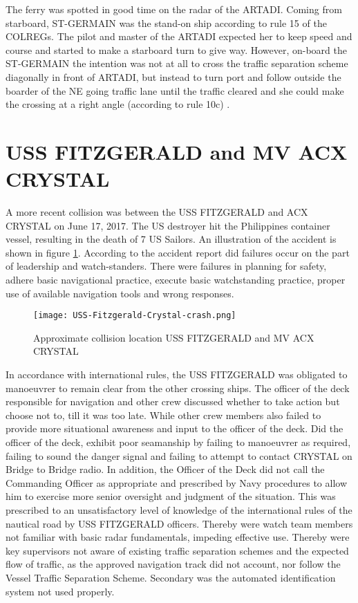 The ferry was spotted in good time on the radar of the ARTADI. Coming from  starboard, ST-GERMAIN was the stand-on ship according to rule 15 of the \ac{COLREGs}. The pilot and master of the ARTADI expected her to keep speed and course and started to make a starboard turn to give way. However, on-board the ST-GERMAIN the intention was not at all to cross the traffic separation scheme diagonally in front of ARTADI, but instead to turn port and follow outside the boarder of the NE going traffic lane until the traffic cleared and she could make the crossing at a right angle (according to rule 10c) \cite{Porathe2013}.

\newpage
\section{USS FITZGERALD and MV ACX CRYSTAL}
A more recent collision was between the USS FITZGERALD and ACX CRYSTAL on June 17, 2017. The US destroyer hit the Philippines container vessel, resulting in the death of 7 US Sailors. An illustration of the accident is shown in figure \ref{fig:Accident-USS-Fitzgerald-Crystal}. According to the accident report did failures occur on the part of leadership and watch-standers. There were failures in planning for safety, adhere basic navigational practice, execute basic watchstanding practice, proper use of available navigation tools and wrong responses.

\begin{figure}[H]
	\centering
	\texttt{[image: USS-Fitzgerald-Crystal-crash.png]}
	\caption{Approximate collision location USS FITZGERALD and MV ACX CRYSTAL}
	\label{fig:Accident-USS-Fitzgerald-Crystal}
\end{figure}

In accordance with international rules, the USS FITZGERALD was obligated to manoeuvrer to remain clear from the other crossing ships. The officer of the deck responsible for navigation and other crew discussed whether to take action but choose not to, till it was too late. While other crew members also failed to provide more situational awareness and input to the officer of the deck. Did the officer of the deck, exhibit poor seamanship by failing to manoeuvrer as required, failing to sound the danger signal and failing to attempt to contact CRYSTAL on Bridge to Bridge radio. In addition, the Officer of the Deck did not call the Commanding Officer as appropriate and prescribed by Navy procedures to allow him to exercise more senior oversight and judgment of the situation. This was prescribed to an unsatisfactory level of knowledge of the international rules of the nautical road by USS FITZGERALD officers. Thereby were watch team members not familiar with basic radar fundamentals, impeding effective use. Thereby were key supervisors not aware of existing traffic separation schemes and the expected flow of traffic, as the approved navigation track did not account, nor follow the Vessel Traffic Separation Scheme. Secondary was the automated identification system not used properly. \cite{USNavy2017}

